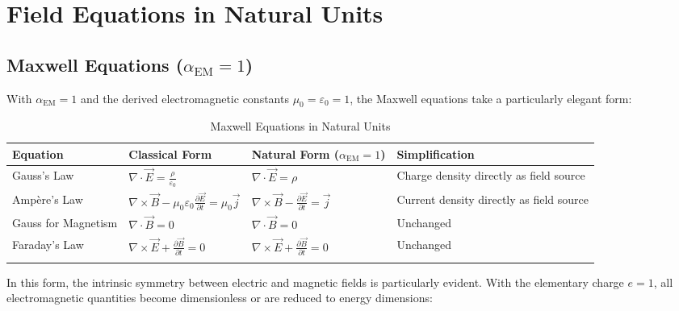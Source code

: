 \documentclass[12pt,a4paper]{article}
\newcommand{\alphaEM}{\alpha_{\text{EM}}}
\begin{document}
	\section{Field Equations in Natural Units}
	
	\subsection{Maxwell Equations ($\alphaEM = 1$)}
	
	With $\alphaEM = 1$ and the derived electromagnetic constants $\mu_0 = \varepsilon_0 = 1$, the Maxwell equations take a particularly elegant form:
	
	\begin{table}[ht]
		\centering
		\begin{adjustbox}{scale=0.75}
			\begin{tabular}{llll}
				\hline
				\textbf{Equation} & \textbf{Classical Form} & \textbf{Natural Form ($\alphaEM = 1$)} & \textbf{Simplification} \\
				\hline
				Gauss’s Law & $\nabla\cdot\vec{E} = \frac{\rho}{\varepsilon_0}$ & $\nabla\cdot\vec{E} = \rho$ & Charge density directly as field source \\
				Ampère’s Law & $\nabla\times\vec{B} - \mu_0\varepsilon_0\frac{\partial\vec{E}}{\partial t} = \mu_0\vec{j}$ & $\nabla\times\vec{B} - \frac{\partial\vec{E}}{\partial t} = \vec{j}$ & Current density directly as field source \\
				Gauss for Magnetism & $\nabla\cdot\vec{B} = 0$ & $\nabla\cdot\vec{B} = 0$ & Unchanged \\
				Faraday’s Law & $\nabla\times\vec{E} + \frac{\partial\vec{B}}{\partial t} = 0$ & $\nabla\times\vec{E} + \frac{\partial\vec{B}}{\partial t} = 0$ & Unchanged \\
				\hline
				\multicolumn{3}{c}{} \\
				\hline
			\end{tabular}
		\end{adjustbox}
		\caption{Maxwell Equations in Natural Units}
		\label{tab:maxwell}
	\end{table}
	
	In this form, the intrinsic symmetry between electric and magnetic fields is particularly evident. With the elementary charge $e = 1$, all electromagnetic quantities become dimensionless or are reduced to energy dimensions:
	
\end{document}
